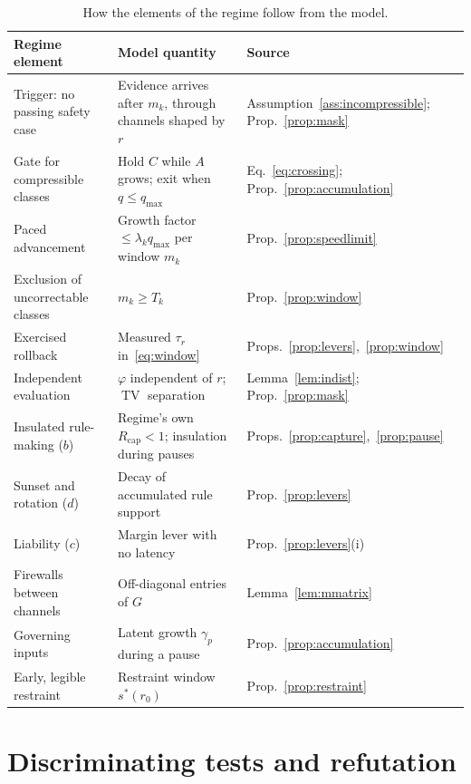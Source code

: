 \documentclass[11pt]{article}
\theoremstyle{plain}
\theoremstyle{definition}
\newcommand{\Rcap}{R_{\mathrm{cap}}}
\newcommand{\qmax}{q_{\max}}
\newcommand{\TV}{\operatorname{TV}}
\begin{document}
\begin{table}[t]
\centering
\small
\renewcommand{\arraystretch}{1.2}
\begin{tabularx}{\linewidth}{@{}>{\raggedright\arraybackslash}p{4.2cm}>{\raggedright\arraybackslash}X>{\raggedright\arraybackslash}p{3.2cm}@{}}
\toprule
Regime element & Model quantity & Source \\
\midrule
Trigger: no passing safety case & Evidence arrives after $m_k$, through channels shaped by $r$ & Assumption~\ref{ass:incompressible}; Prop.~\ref{prop:mask} \\
Gate for compressible classes & Hold $C$ while $A$ grows; exit when $q\le\qmax$ & Eq.~\eqref{eq:crossing}; Prop.~\ref{prop:accumulation} \\
Paced advancement & Growth factor $\le\lambda_k\qmax$ per window $m_k$ & Prop.~\ref{prop:speedlimit} \\
Exclusion of uncorrectable classes & $m_k\ge T_k$ & Prop.~\ref{prop:window} \\
Exercised rollback & Measured $\tau_r$ in~\eqref{eq:window} & Props.~\ref{prop:levers},~\ref{prop:window} \\
Independent evaluation & $\varphi$ independent of $r$; $\TV$ separation & Lemma~\ref{lem:indist}; Prop.~\ref{prop:mask} \\
Insulated rule-making ($b$) & Regime's own $\Rcap<1$; insulation during pauses & Props.~\ref{prop:capture},~\ref{prop:pause} \\
Sunset and rotation ($d$) & Decay of accumulated rule support & Prop.~\ref{prop:levers} \\
Liability ($c$) & Margin lever with no latency & Prop.~\ref{prop:levers}(i) \\
Firewalls between channels & Off-diagonal entries of $G$ & Lemma~\ref{lem:mmatrix} \\
Governing inputs & Latent growth $\gamma_p$ during a pause & Prop.~\ref{prop:accumulation} \\
Early, legible restraint & Restraint window $s^\ast(r_0)$ & Prop.~\ref{prop:restraint} \\
\bottomrule
\end{tabularx}
\caption{How the elements of the regime follow from the model.}
\label{tab:mapping}
\end{table}

\section{Discriminating tests and refutation}\label{sec:tests}
\end{document}
